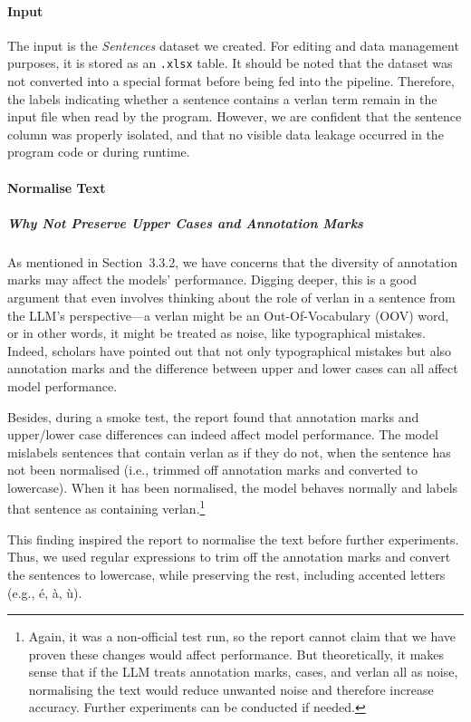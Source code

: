 \documentclass[12pt]{article}
\begin{document}
\paragraph{Input}
The input is the \textit{Sentences} dataset we created. For editing and data management purposes, it is stored as an \texttt{.xlsx} table. It should be noted that the dataset was not converted into a special format before being fed into the pipeline. Therefore, the labels indicating whether a sentence contains a verlan term remain in the input file when read by the program. However, we are confident that the sentence column was properly isolated, and that no visible data leakage occurred in the program code or during runtime.

\paragraph{Normalise Text}
\subparagraph{Why Not Preserve Upper Cases and Annotation Marks}
As mentioned in Section~3.3.2, we have concerns that the diversity of annotation marks may affect the models' performance. Digging deeper, this is a good argument that even involves thinking about the role of verlan in a sentence from the LLM's perspective\;---\;a verlan might be an Out-Of-Vocabulary (OOV) word, or in other words, it might be treated as noise, like typographical mistakes. Indeed, scholars have pointed out that not only typographical mistakes but also annotation marks and the difference between upper and lower cases can all affect model performance\cite{alsharou2021noise}. 

Besides, during a smoke test, the report found that annotation marks and upper/lower case differences can indeed affect model performance. The model mislabels sentences that contain verlan as if they do not, when the sentence has not been normalised (i.e., trimmed off annotation marks and converted to lowercase). When it has been normalised, the model behaves normally and labels that sentence as containing verlan.\footnote{Again, it was a non-official test run, so the report cannot claim that we have proven these changes would affect performance. But theoretically, it makes sense that if the LLM treats annotation marks, cases, and verlan all as noise, normalising the text would reduce unwanted noise and therefore increase accuracy. Further experiments can be conducted if needed.} 

This finding inspired the report to normalise the text before further experiments. Thus, we used regular expressions to trim off the annotation marks and convert the sentences to lowercase, while preserving the rest, including accented letters (e.g., é, à, ù).
\end{document}
